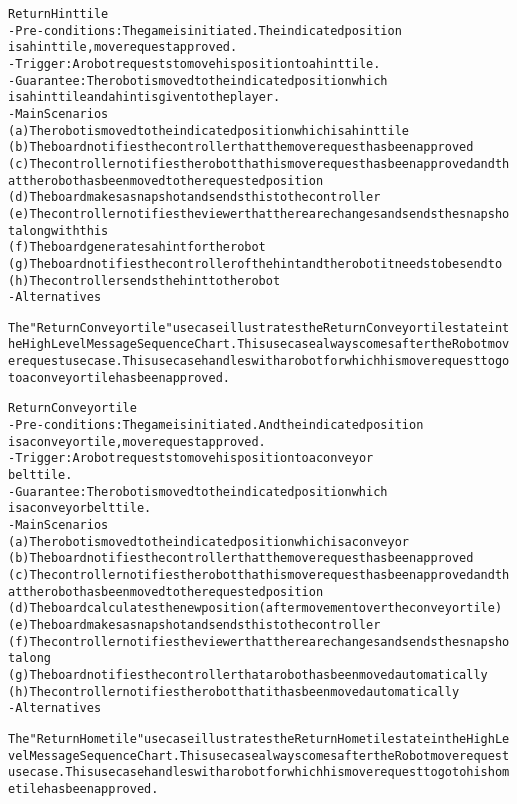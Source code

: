 \begin{alltt}
Return Hint tile
- Pre-conditions: The game is initiated. The indicated position
    is a hint tile, move request approved.
- Trigger: A robot requests to move his position to a hint tile.
- Guarantee: The robot is moved to the indicated position which
    is a hint tile and a hint is given to the player.
- Main Scenarios
    (a) The robot is moved to the indicated position which is a hint tile
    (b) The board notifies the controller that the move request has been approved
    (c) The controller notifies the robot that his move request has been approved and that the robot has been moved to the requested position
    (d) The board makes a snapshot and sends this to the controller
    (e) The controller notifies the viewer that there are changes and sends the snapshot along with this
    (f) The board generates a hint for the robot
    (g) The board notifies the controller of the hint and the robot it needs to be send to
    (h) The controller sends the hint to the robot
- Alternatives

The "Return Conveyor tile" use case illustrates the Return Conveyor tile state in the High Level Message Sequence Chart. This use case always comes after the Robot move request use case. This use case handles with a robot for which his move request to go to a conveyor tile has been approved.

Return Conveyor tile
- Pre-conditions: The game is initiated. And the indicated position
    is a conveyor tile, move request approved.
- Trigger: A robot requests to move his position to a conveyor
    belt tile.
- Guarantee: The robot is moved to the indicated position which
    is a conveyor belt tile.
- Main Scenarios
    (a) The robot is moved to the indicated position which is a conveyor
    (b) The board notifies the controller that the move request has been approved
    (c) The controller notifies the robot that his move request has been approved and that the robot has been moved to the requested position
    (d) The board calculates the new position (after movement over the conveyor tile)
    (e) The board makes a snapshot and sends this to the controller
    (f) The controller notifies the viewer that there are changes and sends the snapshot along
    (g) The board notifies the controller that a robot has been moved automatically
    (h) The controller notifies the robot that it has been moved automatically
- Alternatives

The "Return Home tile" use case illustrates the Return Home tile state in the High Level Message Sequence Chart. This use case always comes after the Robot move request use case. This use case handles with a robot for which his move request to go to his home tile has been approved.


\end{alltt}

